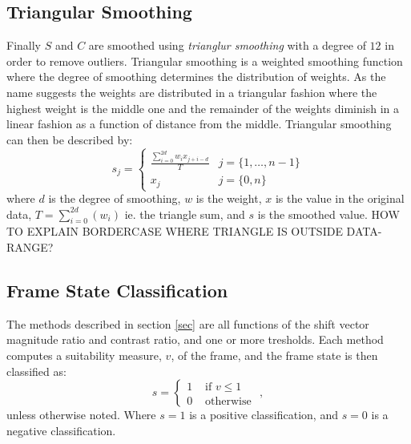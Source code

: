 \subsection{Triangular Smoothing}
%
%
%
%
%
Finally $S$ and $C$ are smoothed using \textit{trianglur smoothing} with a degree of $12$ in order to remove outliers. Triangular smoothing is a weighted smoothing function where the degree of smoothing determines the distribution of weights. As the name suggests the weights are distributed in a triangular fashion where the highest weight is the middle one and the remainder of the weights diminish in a linear fashion as a function of distance from the middle. Triangular smoothing can then be described by:
%
\[
s_{j} = 
\begin{cases}
\frac{\sum_{i=0}^{2d} w_{i}x_{j+i-d}}{T} & j=\{1,\dots,n-1\}\\
x_{j} & j=\{0,n\}
\end{cases}
\]
%
where $d$ is the degree of smoothing, $w$ is the weight, $x$ is the value in the original data, $T = \sum_{i=0}^{2d}(w_{i})$ ie. the triangle sum, and $s$ is the smoothed value. HOW TO EXPLAIN BORDERCASE WHERE TRIANGLE IS OUTSIDE DATA-RANGE? %
%
\subsection{Frame State Classification}
%
The methods described in section \ref{sec} are all functions of the shift vector magnitude ratio and contrast ratio, and one or more tresholds. Each method computes a suitability measure, $v$, of the frame, and the frame state is then classified as:
\[
s = 
\begin{cases}
1 & \text{ if } v \leq 1\\
0 & \text{ otherwise }
\end{cases},
\]
unless otherwise noted. Where $s=1$ is a positive classification, and $s=0$ is a negative classification.
